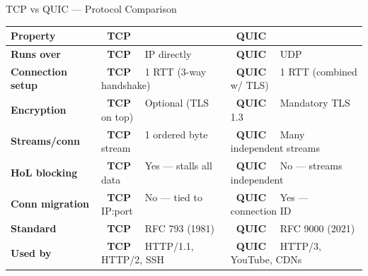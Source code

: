 \documentclass[aspectratio=169]{beamer}
\newcommand{\tcpbadge}{\colorbox{tcpcolor}{\color{white}\tiny\textbf{~TCP~}}}
\newcommand{\quicbadge}{\colorbox{quiccolor}{\color{white}\tiny\textbf{~QUIC~}}}
\begin{document}
\begin{frame}{TCP vs QUIC --- Protocol Comparison}
  \begin{center}
  \footnotesize
  \renewcommand{\arraystretch}{1.3}
  \begin{tabular}{>{\bfseries}l >{\tcpbadge~}l >{\quicbadge~}l}
    \toprule
    \textbf{Property} & \multicolumn{1}{c}{\tcpbadge\ TCP} & \multicolumn{1}{c}{\quicbadge\ QUIC} \\
    \midrule
    Runs over        & IP directly & UDP \\
    Connection setup & 1 RTT (3-way handshake) & 1 RTT (combined w/ TLS) \\
    Encryption       & Optional (TLS on top)  & Mandatory TLS 1.3 \\
    Streams/conn     & 1 ordered byte stream  & Many independent streams \\
    HoL blocking     & \textcolor{red!70!black}{Yes --- stalls all data} & \textcolor{codegreen}{No --- streams independent} \\
    Conn migration   & \textcolor{red!70!black}{No --- tied to IP:port} & \textcolor{codegreen}{Yes --- connection ID} \\
    Standard         & RFC 793 (1981) & RFC 9000 (2021) \\
    Used by          & HTTP/1.1, HTTP/2, SSH & HTTP/3, YouTube, CDNs \\
    \bottomrule
  \end{tabular}
  \end{center}
\end{frame}
\end{document}
